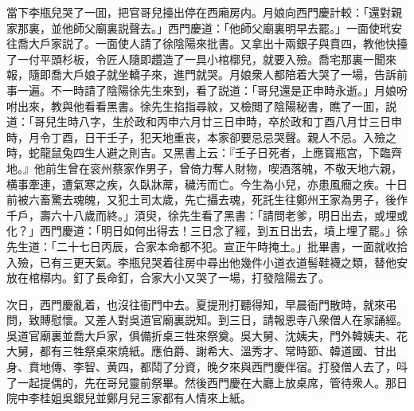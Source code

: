 當下李瓶兒哭了一囬，把官哥兒擡出停在西廂房内。月娘向西門慶計較：「還對親家那裏，並他師父廟裏説聲去。」西門慶道：「他師父廟裏明早去罷。」一面使玳安往喬大戶家説了。一面使人請了徐陰陽來批書。又拿出十兩銀子與賁四，教他快擡了一付平頭杉板，令匠人隨即趲造了一具小棺槨兒，就要入殮。喬宅那裏一聞來報，隨即喬大戶娘子就坐轎子來，進門就哭。月娘衆人都陪着大哭了一場，告訴前事一遍。不一時請了陰陽徐先生來到，看了説道：「哥兒還是正申時永逝。」月娘吩咐出來，教與他看看黑書。徐先生掐指尋紋，又檢閲了陰陽秘書，瞧了一囬，説道：「哥兒生時八字，生於政和丙申六月廿三日申時，卒於政和丁酉八月廿三日申時，月令丁酉，日干壬子，犯天地重丧，本家卻要忌忌哭聲。親人不忌。入殮之時，蛇龍鼠兔四生人避之則吉。又黑書上云：『壬子日死者，上應寳瓶宫，下臨齊地。』他前生曾在衮州蔡家作男子，曾倚力奪人財物，喫酒落魄，不敬天地六親，横事牽連，遭氣寒之疾，久臥牀蓆，穢汚而亡。今生為小兒，亦患風癇之疾。十日前被六畜驚去魂魄，又犯土司太歲，先亡攝去魂，死託生往鄭州王家為男子，後作千戶，壽六十八歲而終。」湏臾，徐先生看了黑書：「請問老爹，明日出去，或埋或化？」西門慶道：「明日如何出得去！三日念了經，到五日出去，墳上埋了罷。」徐先生道：「二十七日丙辰，合家本命都不犯。宣正午時掩土。」批畢書，一面就收拾入殮，已有三更天氣。李瓶兒哭着往房中尋出他幾件小道衣道髻鞋襪之類，替他安放在棺槨内。釘了長命釘，合家大小又哭了一場，打發陰陽去了。

次日，西門慶亂着，也沒往衙門中去。夏提刑打聽得知，早晨衙門散時，就來弔問，致賻慰懷。又差人對吳道官廟裏説知。到三日，請報恩寺八衆僧人在家誦經。吳道官廟裏並喬大戶家，俱備折桌三牲來祭奠。吳大舅、沈姨夫，門外韓姨夫、花大舅，都有三牲祭桌來燒紙。應伯爵、謝希大、溫秀才、常時節、韓道國、甘出身、賁地傳、李智、黄四，都鬦了分資，晚夕來與西門慶伴宿。打發僧人去了，呌了一起提偶的，先在哥兒靈前祭畢。然後西門慶在大廳上放桌席，管待衆人。那日院中李桂姐吳銀兒並鄭月兒三家都有人情來上紙。

